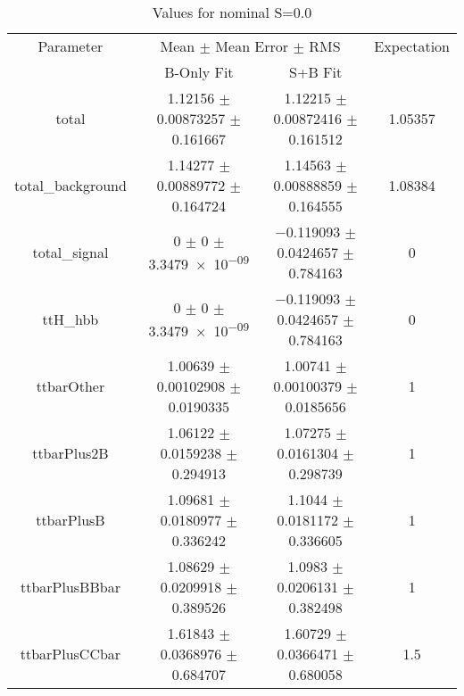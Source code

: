 \begin{table}
\centering
\caption{Values for nominal S=0.0}
\begin{tabular}{cccc}
\toprule
Parameter & \multicolumn{2}{c}{Mean $\pm$ Mean Error $\pm$ RMS} & Expectation\\
 & B-Only Fit & S+B Fit & \\
\midrule
total & \num{1.12156} $\pm$ \num{0.00873257} $\pm$ \num{0.161667} & \num{1.12215} $\pm$ \num{0.00872416} $\pm$ \num{0.161512} & \num{1.05357}\\
total\_background & \num{1.14277} $\pm$ \num{0.00889772} $\pm$ \num{0.164724} & \num{1.14563} $\pm$ \num{0.00888859} $\pm$ \num{0.164555} & \num{1.08384}\\
total\_signal & \num{0} $\pm$ \num{0} $\pm$ \num{3.3479e-09} & \num{-0.119093} $\pm$ \num{0.0424657} $\pm$ \num{0.784163} & \num{0}\\
ttH\_hbb & \num{0} $\pm$ \num{0} $\pm$ \num{3.3479e-09} & \num{-0.119093} $\pm$ \num{0.0424657} $\pm$ \num{0.784163} & \num{0}\\
ttbarOther & \num{1.00639} $\pm$ \num{0.00102908} $\pm$ \num{0.0190335} & \num{1.00741} $\pm$ \num{0.00100379} $\pm$ \num{0.0185656} & \num{1}\\
ttbarPlus2B & \num{1.06122} $\pm$ \num{0.0159238} $\pm$ \num{0.294913} & \num{1.07275} $\pm$ \num{0.0161304} $\pm$ \num{0.298739} & \num{1}\\
ttbarPlusB & \num{1.09681} $\pm$ \num{0.0180977} $\pm$ \num{0.336242} & \num{1.1044} $\pm$ \num{0.0181172} $\pm$ \num{0.336605} & \num{1}\\
ttbarPlusBBbar & \num{1.08629} $\pm$ \num{0.0209918} $\pm$ \num{0.389526} & \num{1.0983} $\pm$ \num{0.0206131} $\pm$ \num{0.382498} & \num{1}\\
ttbarPlusCCbar & \num{1.61843} $\pm$ \num{0.0368976} $\pm$ \num{0.684707} & \num{1.60729} $\pm$ \num{0.0366471} $\pm$ \num{0.680058} & \num{1.5}\\
\bottomrule
\end{tabular}
\end{table}